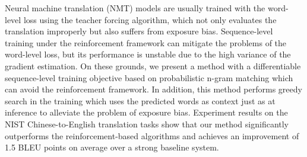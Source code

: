 Neural machine translation (NMT) models are usually trained with the word-level loss using the teacher forcing algorithm, which not only evaluates the translation improperly but also suffers from exposure bias. Sequence-level training under the reinforcement framework can mitigate the problems of the word-level loss, but its performance is unstable due to the high variance of the gradient estimation. On these grounds, we present a method with a differentiable sequence-level training objective based on probabilistic n-gram matching which can avoid the reinforcement framework. In addition, this method performs greedy search in the training which uses the predicted words as context just as at inference to alleviate the problem of exposure bias. Experiment results on the NIST Chinese-to-English translation tasks show that our method significantly outperforms the reinforcement-based algorithms and achieves an improvement of 1.5 BLEU points on average over a strong baseline system.
